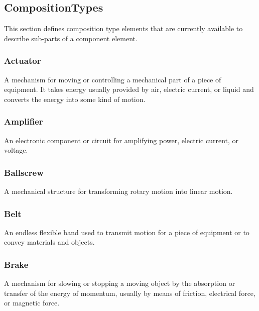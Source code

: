 \subsection{CompositionTypes} \label{sec:CompositionTypes}

This section defines \gls{composition} type elements that are currently available to describe sub-parts of a \gls{component} element.


\subsubsection{Actuator}
  \label{sec:Actuator}


A mechanism for moving or controlling a mechanical part of a piece of equipment.   
 It takes energy usually provided by air, electric current, or liquid and converts the energy into some kind of motion. 

\FloatBarrier

\subsubsection{Amplifier}
  \label{sec:Amplifier}


An electronic component or circuit for amplifying power, electric current, or voltage.

\FloatBarrier

\subsubsection{Ballscrew}
  \label{sec:Ballscrew}


A mechanical structure for transforming rotary motion into linear motion.

\FloatBarrier

\subsubsection{Belt}
  \label{sec:Belt}


An endless flexible band used to transmit motion for a piece of equipment or to convey materials and objects.

\FloatBarrier

\subsubsection{Brake}
  \label{sec:Brake}


A mechanism for slowing or stopping a moving object by the absorption or transfer of the energy of momentum, usually by means of friction, electrical force, or magnetic force.

